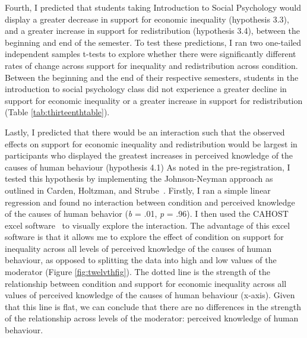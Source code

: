 \documentclass{sfuthesis}
\begin{document}
Fourth, I predicted that students taking Introduction to Social Psychology would display a greater decrease in support for economic inequality (hypothesis 3.3), and a greater increase in support for redistribution (hypothesis 3.4), between the beginning and end of the semester. To test these predictions, I ran two one-tailed independent samples t-tests to explore whether there were significantly different rates of change across support for inequality and redistribution across condition. Between the beginning and the end of their respective semesters, students in the introduction to social psychology class did not experience a greater decline in support for economic inequality or a greater increase in support for redistribution (Table \ref{tab:thirteenthtable}). 

Lastly, I predicted that there would be an interaction such that the observed effects on support for economic inequality and redistribution would be largest in participants who displayed the greatest increases in perceived knowledge of the causes of human behaviour (hypothesis 4.1) As noted in the pre-registration, I tested this hypothesis by implementing the Johnson-Neyman approach as outlined in Carden, Holtzman, and Strube~\cite{carden17}. Firstly, I ran a simple linear regression and found no interaction between condition and perceived knowledge of the causes of human behavior (\textit{b} = .01, \textit{p} = .96). I then used the CAHOST excel software~\cite{carden17} to visually explore the interaction. The advantage of this excel software is that it allows me to explore the effect of condition on support for inequality across all levels of perceived knowledge of the causes of human behaviour, as opposed to splitting the data into high and low values of the moderator (Figure \ref{fig:twelvthfig}). The dotted line is the strength of the relationship between condition and support for economic inequality across all values of perceived knowledge of the causes of human behaviour (x-axis). Given that this line is flat, we can conclude that there are no differences in the strength of the relationship across levels of the moderator: perceived knowledge of human behaviour. 
\end{document}
